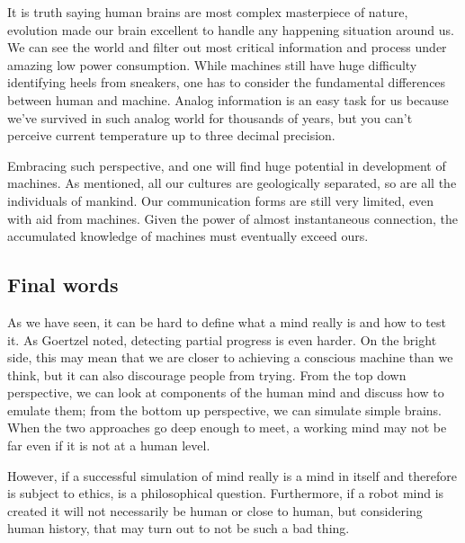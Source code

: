 \documentclass[11pt]{article}
\newenvironment{draft}{\color{dark-cornflower-blue-2}}{\ignorespacesafterend}
\begin{document}
It is truth saying human brains are most complex masterpiece of nature, evolution made our brain excellent to handle any happening situation around us. We can see the world and filter out most critical information and process under amazing low power consumption. While machines still have huge difficulty identifying heels from sneakers, one has to consider the fundamental differences between human and machine. Analog information is an easy task for us because we've survived in such analog world for thousands of years, but you can't perceive current temperature up to three decimal precision.

Embracing such perspective, and one will find huge potential in development of machines. As mentioned, all our cultures are geologically separated, so are all the individuals of mankind. Our communication forms are still very limited, even with aid from machines. Given the power of almost instantaneous connection, the accumulated knowledge of machines must eventually exceed ours.

\subsection{Final words}
\begin{draft}
As we have seen, it can be hard to define what a mind really is and how to test it. 
As Goertzel noted, detecting partial progress is even harder. 
On the bright side, this may mean that we are closer to achieving a conscious machine than we think, but it can also discourage people from trying. 
From the top down perspective, we can look at components of the human mind and discuss how to emulate them; from the bottom up perspective, we can simulate simple brains. 
When the two approaches go deep enough to meet, a working mind may not be far even if it is not at a human level.

However, if a successful simulation of mind really is a mind in itself and therefore is subject to ethics, is a philosophical question. Furthermore, if a robot mind is created it will not necessarily be human or close to human, but considering human history, that may turn out to not be such a bad thing.

\end{draft}





\end{document}

